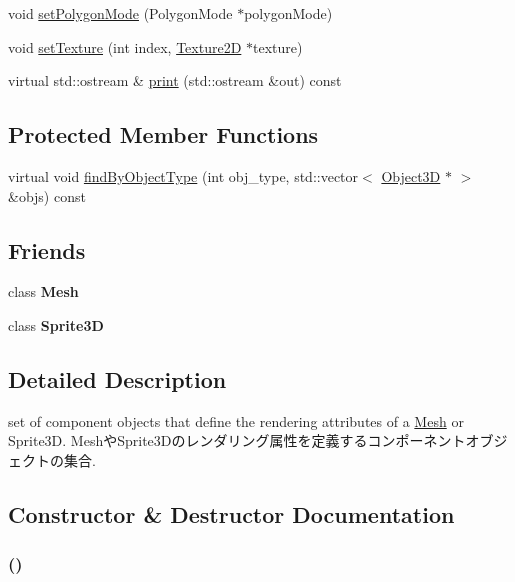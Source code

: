 \begin{CompactItemize}
\item 
void \hyperlink{classm3g_1_1Appearance_cc21fac7868e2ad37e689ac642db1aae}{setPolygonMode} (PolygonMode $\ast$polygonMode)
\item 
void \hyperlink{classm3g_1_1Appearance_493e54b1c7ab839b9e76b28e0629cf6a}{setTexture} (int index, \hyperlink{classm3g_1_1Texture2D}{Texture2D} $\ast$texture)
\item 
virtual std::ostream \& \hyperlink{classm3g_1_1Appearance_6fea17fa1532df3794f8cb39cb4f911f}{print} (std::ostream \&out) const 
\end{CompactItemize}
\subsection*{Protected Member Functions}
\begin{CompactItemize}
\item 
virtual void \hyperlink{classm3g_1_1Appearance_4dadb21b568b0230fac106f15040138c}{findByObjectType} (int obj\_\-type, std::vector$<$ \hyperlink{classm3g_1_1Object3D}{Object3D} $\ast$ $>$ \&objs) const 
\end{CompactItemize}
\subsection*{Friends}
\begin{CompactItemize}
\item 
\hypertarget{classm3g_1_1Appearance_a41a130f156b145bffb3f4b5172c4c93}{
class \textbf{Mesh}}
\label{classm3g_1_1Appearance_a41a130f156b145bffb3f4b5172c4c93}

\item 
\hypertarget{classm3g_1_1Appearance_639cf38c41878a4f0fc8d24c010c96de}{
class \textbf{Sprite3D}}
\label{classm3g_1_1Appearance_639cf38c41878a4f0fc8d24c010c96de}

\end{CompactItemize}


\subsection{Detailed Description}
set of component objects that define the rendering attributes of a \hyperlink{classm3g_1_1Mesh}{Mesh} or Sprite3D. MeshやSprite3Dのレンダリング属性を定義するコンポーネントオブジェクトの集合. 

\subsection{Constructor \& Destructor Documentation}
\hypertarget{classm3g_1_1Appearance_2e594c7b96cb5cfad839a98b57f5d42f}{
\subsubsection[{Appearance}]{ ()}}
\label{classm3g_1_1Appearance_2e594c7b96cb5cfad839a98b57f5d42f}


